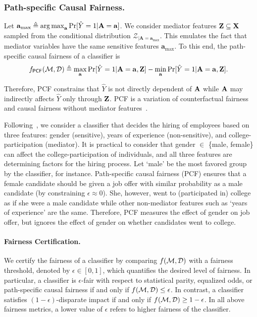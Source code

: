 \subsubsection{Path-specific Causal Fairness.}
Let $ \mathbf{a}_{\max}  \triangleq \operatorname*{arg\,max}_{ \mathbf{a}} \Pr[\hat{Y} =1 |\mathbf{A}=  \mathbf{a}] $. We consider mediator features $ \mathbf{Z} \subseteq \mathbf{X} $ sampled from the conditional distribution $ {\mathcal{Z}_{|\mathbf{A} = \mathbf{a}_{\max}}} $. This emulates the fact that mediator variables have the same sensitive features $ \mathbf{a}_{\max} $.   To this end, the path-specific causal fairness of a classifier is \[
 f_{\mathsf{PCF}}(\mathcal{M}, \mathcal{D}) \triangleq \max_{\mathbf{a}}\Pr[\hat{Y} = 1 | \mathbf{A} =  \mathbf{a}, \mathbf{Z}] - \min_{\mathbf{a}} \Pr[\hat{Y} = 1 | \mathbf{A} = \mathbf{a}, \mathbf{Z} ].
\]



Therefore, PCF constrains that $ \hat{Y} $ is not directly dependent of $ \mathbf{A} $ while $ \mathbf{A} $ may indirectly affects $ \hat{Y} $ only through $ \mathbf{Z} $. PCF is a variation of counterfactual fairness and causal fairness without mediator features~\cite{bastani2019probabilistic}. 




\begin{example}
	Following~\cite{bastani2019probabilistic}, we consider a classifier that decides the hiring of employees based on three features: gender (sensitive), years of experience (non-sensitive), and college-participation (mediator). It is practical to consider that gender $ \in $ \{male, female\} can affect the college-participation of individuals, and all three features are determining factors for the hiring process. Let `male' be the most favored group by the classifier, for instance. Path-specific causal fairness (PCF) ensures that a female candidate should be given a job offer with similar probability as a male candidate (by constraining $ \epsilon \approx 0 $). She,  however,  went to (participated in) college as if she were a male candidate while other non-mediator features such as  `years of experience' are the same.  Therefore, PCF measures the effect of gender on job offer, but ignores the effect of gender on whether candidates went to college.
\end{example}	



\paragraph{Fairness Certification.} We certify the fairness of a classifier by comparing $ f(\mathcal{M}, \mathcal{D}) $ with a fairness threshold, denoted by $ \epsilon \in [0,1] $, which quantifies the desired level of fairness. In particular, a classifier is $ \epsilon $-fair with respect to statistical parity, equalized odds, or path-specific causal fairness if and only if $ f(\mathcal{M}, \mathcal{D}) \le \epsilon $. In contrast, a classifier satisfies $(1 - \epsilon)$-disparate impact  if and only if $ f(\mathcal{M}, \mathcal{D}) \ge 1 - \epsilon $. In all above fairness metrics, a lower value of $ \epsilon $ refers to higher fairness of the classifier.






